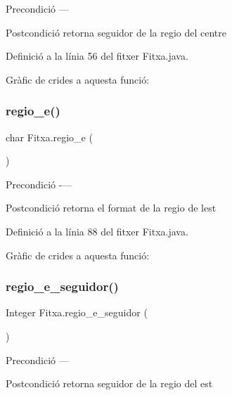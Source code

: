 \begin{DoxyPrecond}{Precondició}
--- 
\end{DoxyPrecond}
\begin{DoxyPostcond}{Postcondició}
retorna seguidor de la regio del centre 
\end{DoxyPostcond}


Definició a la línia 56 del fitxer Fitxa.\+java.

Gràfic de crides a aquesta funció\+:
\mbox{\label{class_fitxa_a929a959f9c3d8f263a44763f404c1f0d}} 
\subsubsection{\texorpdfstring{regio\+\_\+e()}{regio\_e()}}
{\footnotesize\ttfamily char Fitxa.\+regio\+\_\+e (\begin{DoxyParamCaption}{ }\end{DoxyParamCaption})}

\begin{DoxyPrecond}{Precondició}
-\/--- 
\end{DoxyPrecond}
\begin{DoxyPostcond}{Postcondició}
retorna el format de la regio de l\textquotesingle{}est 
\end{DoxyPostcond}


Definició a la línia 88 del fitxer Fitxa.\+java.

Gràfic de crides a aquesta funció\+:
\mbox{\label{class_fitxa_a96ca7466a7c6f305f08b5ee139cd3d6d}} 
\subsubsection{\texorpdfstring{regio\+\_\+e\+\_\+seguidor()}{regio\_e\_seguidor()}}
{\footnotesize\ttfamily Integer Fitxa.\+regio\+\_\+e\+\_\+seguidor (\begin{DoxyParamCaption}{ }\end{DoxyParamCaption})}

\begin{DoxyPrecond}{Precondició}
--- 
\end{DoxyPrecond}
\begin{DoxyPostcond}{Postcondició}
retorna seguidor de la regio del est 
\end{DoxyPostcond}


